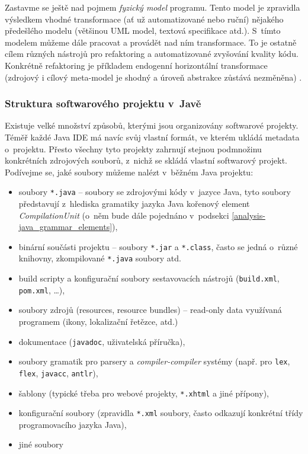 Zastavme se ještě nad pojmem \emph{fyzický model} programu. Tento model je zpravidla výsledkem vhodné transformace (ať už automatizované nebo ruční) nějakého předešlého modelu (většinou UML model, textová specifikace atd.). S~tímto modelem můžeme dále pracovat a provádět nad ním transformace. To je ostatně cílem různých nástrojů pro refaktoring a automatizované zvyšování kvality kódu. Konkrétně refaktoring je příkladem endogenní horizontální transformace (zdrojový i cílový meta-model je shodný a úroveň abstrakce zůstává nezměněna) \cite{Mens05ataxonomy}.

\subsubsection{Struktura softwarového projektu v~Javě}
Existuje velké množství způsobů, kterými jsou organizovány softwarové projekty. Téměř každé Java IDE má navíc svůj vlastní formát, ve kterém ukládá metadata o~projektu. Přesto všechny tyto projekty zahrnují stejnou podmnožinu konkrétních zdrojových souborů, z~nichž se skládá vlastní softwarový projekt. Podívejme se, jaké soubory můžeme nalézt v~běžném Java projektu:

\begin{itemize}
\item soubory \verb+*.java+ -- soubory se zdrojovými kódy v~jazyce Java, tyto soubory představují z~hlediska gramatiky jazyka Java kořenový element \emph{CompilationUnit} (o~něm bude dále pojednáno v~podsekci \ref{analysis-java_grammar_elements}),
\item binární součásti projektu -- soubory \verb+*.jar+ a \verb+*.class+, často se jedná o~různé knihovny, zkompilované \verb+*.java+ soubory atd.
\item build scripty a konfigurační soubory sestavovacích nástrojů (\verb+build.xml+, \verb+pom.xml+, \ldots),
\item soubory zdrojů (resources, resource bundles) -- read-only data využívaná programem (ikony, lokalizační řetězce, atd.)
\item dokumentace (\verb+javadoc+, uživatelská příručka),
\item soubory gramatik pro parsery a \emph{compiler-compiler} systémy (např. pro \verb+lex+, \verb+flex+, \verb+javacc+, \verb+antlr+),
\item šablony (typické třeba pro webové projekty, \verb+*.xhtml+ a jiné přípony),
\item konfigurační soubory (zpravidla \verb+*.xml+ soubory, často odkazují konkrétní třídy programovacího jazyka Java),
\item jiné soubory
\end{itemize}


